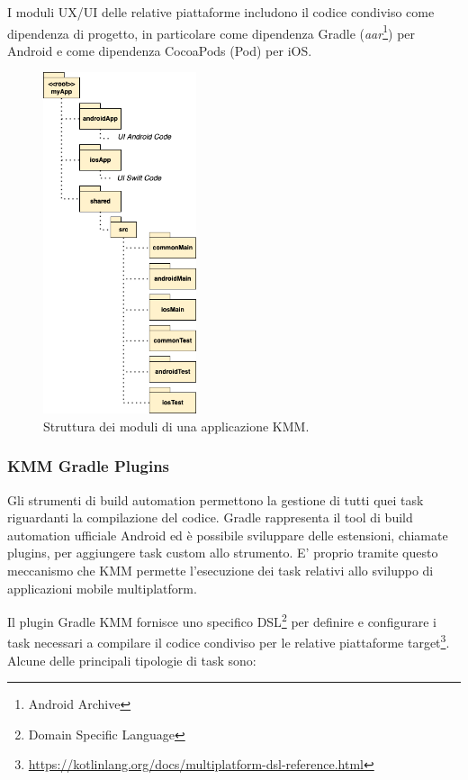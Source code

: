 I moduli UX/UI delle relative piattaforme includono il codice condiviso come dipendenza di progetto, in particolare come dipendenza Gradle (\textit{aar}\footnote{Android Archive}) per Android e come dipendenza CocoaPods (Pod) per iOS.

\begin{figure}[H]
    \centering
    \includegraphics[width=0.4\textwidth]{img/struttura_app_kmm.png}
    \caption{Struttura dei moduli di una applicazione KMM.}
\end{figure}

\subsubsection{KMM Gradle Plugins}
Gli strumenti di build automation permettono la gestione di tutti quei task riguardanti la compilazione del codice. Gradle rappresenta il tool di build automation ufficiale Android ed è possibile sviluppare delle estensioni, chiamate plugins, per aggiungere task custom allo strumento. E' proprio tramite questo meccanismo che KMM permette l'esecuzione dei task relativi allo sviluppo di applicazioni mobile multiplatform.

Il plugin Gradle KMM fornisce uno specifico DSL\footnote{Domain Specific Language} per definire e configurare i task necessari a compilare il codice condiviso per le relative piattaforme target\footnote{\href{https://kotlinlang.org/docs/multiplatform-dsl-reference.html}{https://kotlinlang.org/docs/multiplatform-dsl-reference.html}}. Alcune delle principali tipologie di task sono:

